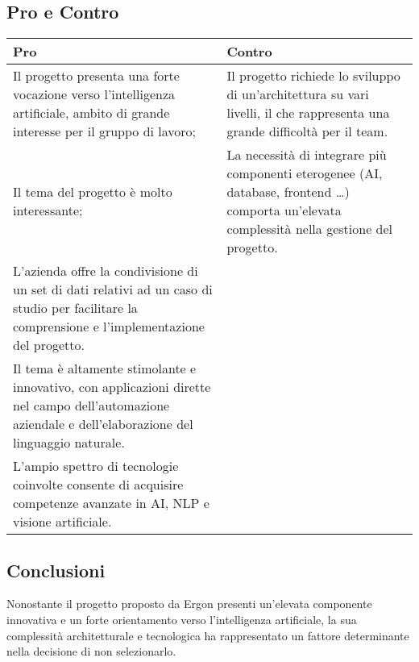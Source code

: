 \documentclass[a4paper,12pt]{article}
\begin{document}
{    \subsection*{Pro e Contro}{

        \begin{center} 
            \begin{tabular}{|p{9cm}|p{5cm}|}
                \hline
                \textbf{Pro} & \textbf{Contro} \\
                \hline
                Il progetto presenta una forte vocazione verso l'intelligenza artificiale, ambito di grande interesse per il gruppo di lavoro; & Il progetto richiede lo sviluppo di un'architettura su vari livelli, il che rappresenta una grande difficoltà per il team. \\
                \hline
                Il tema del progetto è molto interessante; & La necessità di integrare più componenti eterogenee (AI, database, frontend …) comporta un'elevata complessità nella gestione del progetto.\\
                \hline
                L'azienda offre la condivisione di un set di dati relativi ad un caso di studio per facilitare la comprensione e l'implementazione del progetto. & \\
                \hline 
                Il tema è altamente stimolante e innovativo, con applicazioni dirette nel campo dell'automazione aziendale e dell'elaborazione del linguaggio naturale. & \\
                \hline 
                L'ampio spettro di tecnologie coinvolte consente di acquisire competenze avanzate in AI, NLP e visione artificiale. & \\
                \hline 
            \end{tabular}
        \end{center}

    }

    \subsection*{Conclusioni}{
        Nonostante il progetto proposto da Ergon presenti un'elevata componente innovativa e un forte orientamento verso l'intelligenza artificiale, la sua complessità architetturale e tecnologica ha rappresentato un fattore determinante nella decisione di non selezionarlo.
    }
}

\newpage
\end{document}

